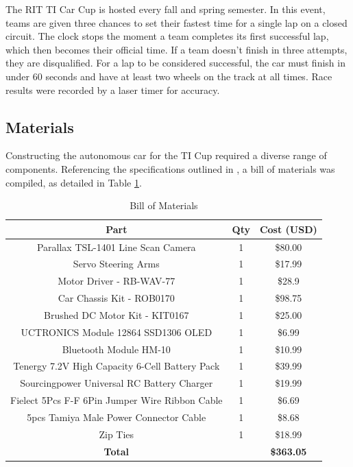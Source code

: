 \documentclass[conference]{IEEEtran}
\begin{document}
The RIT TI Car Cup is hosted every fall and spring semester. In this event, teams are given three chances to set their fastest time for a single lap on a closed circuit. The clock stops the moment a team completes its first successful lap, which then becomes their official time. If a team doesn't finish in three attempts, they are disqualified. For a lap to be considered successful, the car must finish in under 60 seconds and have at least two wheels on the track at all times. Race results were recorded by a laser timer for accuracy.

\subsection{Materials}

Constructing the autonomous car for the TI Cup required a diverse range of components. Referencing the specifications outlined in \cite{carCup2022}, a bill of materials was compiled, as detailed in Table \ref{table:billOfMaterials}.

\begin{table}[htbp]
\caption{Bill of Materials}
\begin{center}
\begin{tabular}{|c|c|c|}
\hline
Part & Qty & Cost (USD) \\
\hline
Parallax TSL-1401 Line Scan Camera & 1 & \$80.00 \\
\hline
Servo Steering Arms & 1 & \$17.99 \\
\hline
Motor Driver - RB-WAV-77 & 1 & \$28.9 \\
\hline
Car Chassis Kit - ROB0170 & 1 & \$98.75 \\
\hline
Brushed DC Motor Kit - KIT0167 & 1 & \$25.00 \\
\hline
UCTRONICS Module 12864 SSD1306 OLED & 1 & \$6.99 \\
\hline
Bluetooth Module HM-10 & 1 & \$10.99 \\
\hline
Tenergy 7.2V High Capacity 6-Cell Battery Pack & 1 & \$39.99 \\
\hline
Sourcingpower Universal RC Battery Charger & 1 & \$19.99 \\
\hline
Fielect 5Pcs F-F 6Pin Jumper Wire Ribbon Cable & 1 & \$6.69 \\
\hline
5pcs Tamiya Male Power Connector Cable & 1 & \$8.68 \\
\hline
Zip Ties & 1 & \$18.99 \\
\hline
\textbf{Total} & & \textbf{\$363.05} \\
\hline
\end{tabular}
\label{table:billOfMaterials}
\end{center}
\end{table}
\end{document}
